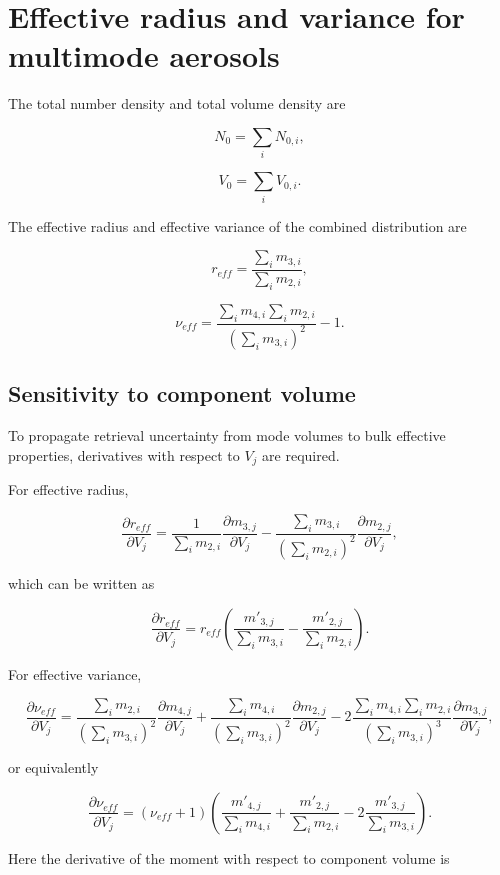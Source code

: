 \documentclass[
  letterpaper,
  open=any]{scrbook}
\begin{document}
\section{Effective radius and variance for multimode
aerosols}\label{effective-radius-and-variance-for-multimode-aerosols}

The total number density and total volume density are

\[
N_0=\sum_i N_{0,i},
\]

\[
V_0=\sum_i V_{0,i}.
\]

The effective radius and effective variance of the combined distribution
are

\[
r_{eff}=\frac{\sum_i m_{3,i}}{\sum_i m_{2,i}},
\]

\[
\nu_{eff}=\frac{\sum_i m_{4,i} \sum_i m_{2,i}}{(\sum_i m_{3,i})^2}-1.
\]

\subsection{Sensitivity to component
volume}\label{sensitivity-to-component-volume}

To propagate retrieval uncertainty from mode volumes to bulk effective
properties, derivatives with respect to \(V_j\) are required.

For effective radius,

\[
\frac{\partial r_{eff}}{\partial V_{j}} =
\frac{1}{\sum_i  m_{2,i}}\frac{\partial m_{3,j}}{\partial V_j}- 
\frac{\sum_i m_{3,i}}{(\sum_i m_{2,i})^2}\frac{\partial m_{2,j}}{\partial V_j},
\]

which can be written as

\[
\frac{\partial r_{eff}}{\partial V_{j}} =
r_{eff} \left(\frac{m'_{3,j}}{\sum_i  m_{3,i}}-\frac{m'_{2,j}}{\sum_i  m_{2,i}}\right).
\]

For effective variance,

\[
\frac{\partial \nu_{eff}}{\partial V_j}=
\frac{\sum_i m_{2,i}}{(\sum_i m_{3,i})^2}\frac{\partial m_{4,j}}{\partial V_j}+
\frac{\sum_i m_{4,i}}{(\sum_i m_{3,i})^2}\frac{\partial m_{2,j}}{\partial V_j}
-2\frac{\sum_i m_{4,i} \sum_i m_{2,i}}{(\sum_i m_{3,i})^3}\frac{\partial m_{3,j}}{\partial V_j},
\]

or equivalently

\[
\frac{\partial \nu_{eff}}{\partial V_j}=
(\nu_{eff}+1) \left(\frac{m'_{4,j}}{\sum_i  m_{4,i}}+\frac{m'_{2,j}}{\sum_i m_{2,i}} 
-2\frac{m'_{3,j}}{\sum_i  m_{3,i}}\right).
\]

Here the derivative of the moment with respect to component volume is
\end{document}
